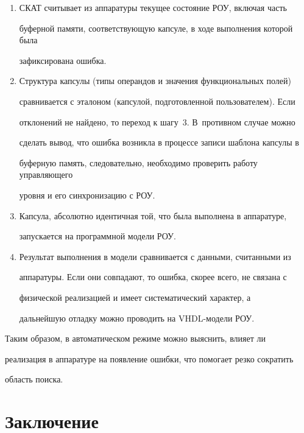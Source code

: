       \begin{enumerate}[1.]


\item СКАТ считывает из аппаратуры текущее состояние РОУ, включая часть 


буферной памяти, соответствующую капсуле, в ходе выполнения которой была 


зафиксирована ошибка.


\item Структура капсулы (типы операндов и значения функциональных полей) 


сравнивается с эталоном (капсулой, подготовленной пользователем). Если 


отклонений не найдено, то переход к шагу~3. В~противном случае можно 


сделать вывод, что ошибка возникла в процессе записи шаблона капсулы в 


буферную память, следовательно, необходимо проверить работу управ\-ля\-юще\-го 


уровня и его синхронизацию с РОУ.


\item Капсула, абсолютно идентичная той, что была выполнена в аппаратуре, 


запускается на программной модели РОУ.


\item Результат выполнения в модели сравнивается с данными, считанными из 


аппаратуры. Если они совпадают, то ошибка, скорее всего, не связана с 


физической реализацией и имеет сис\-те\-ма\-ти\-че\-ский характер, а 


дальнейшую отладку можно проводить на VHDL-мо\-де\-ли РОУ.


\end{enumerate}





      Таким образом, в автоматическом режиме можно выяснить, влияет ли 


реализация в аппаратуре на появление ошибки, что помогает резко сократить 


область поиска. 


\section{Заключение}





